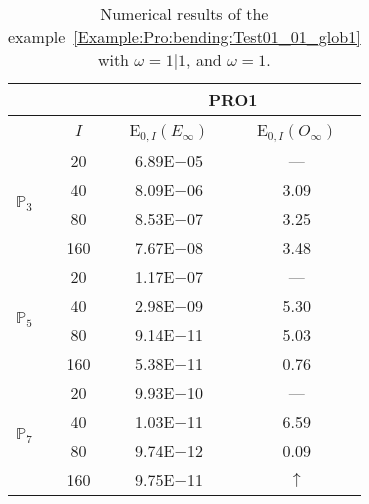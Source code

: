 \begin{table}[H]
\caption{Numerical results of the example~\ref{Example:Pro:bending:Test01_01_glob1} with $\omega=1|1$, and $\omega=1$.}
\setlength{\tabcolsep}{5pt}
\centering
\begin{tabular}{@{}l c c c@{}}
\toprule
 &  & \multicolumn{2}{c}{PRO1}\\
\midrule
 & $I$ & E$_{0,I}(E_{\infty})$ & E$_{0,I}(O_{\infty})$\\
\midrule
\multirow{4}{*}{$\mathbb{P}_{3}$} & 20 & 6.89E$-$05 & ---\\
 & 40 & 8.09E$-$06 & 3.09\\
 & 80 & 8.53E$-$07 & 3.25\\
 & 160 & 7.67E$-$08 & 3.48\\
\midrule
\multirow{4}{*}{$\mathbb{P}_{5}$} & 20 & 1.17E$-$07 & ---\\
 & 40 & 2.98E$-$09 & 5.30\\
 & 80 & 9.14E$-$11 & 5.03\\
 & 160 & 5.38E$-$11 & 0.76\\
\midrule
\multirow{4}{*}{$\mathbb{P}_{7}$} & 20 & 9.93E$-$10 & ---\\
 & 40 & 1.03E$-$11 & 6.59\\
 & 80 & 9.74E$-$12 & 0.09\\
 & 160 & 9.75E$-$11 & $\uparrow$\\
\bottomrule
\end{tabular}
\label{Table:PRO:test_01_01_test19}
\end{table}
